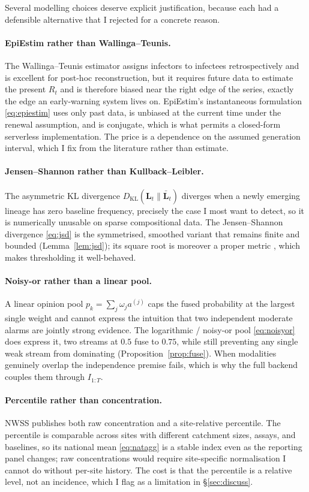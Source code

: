 \documentclass[10pt,twocolumn]{article}
\theoremstyle{definition}
\newcommand{\Rt}{R_t}
\newcommand{\KL}{D_{\mathrm{KL}}}
\begin{document}
Several modelling choices deserve explicit justification, because each had a
defensible alternative that I rejected for a concrete reason.

\paragraph{EpiEstim rather than Wallinga--Teunis.}
The Wallinga--Teunis estimator assigns infectors to infectees retrospectively and
is excellent for post-hoc reconstruction, but it requires future data to estimate
the present $\Rt$ and is therefore biased near the right edge of the series, exactly
the edge an early-warning system lives on. EpiEstim's instantaneous formulation
\eqref{eq:epiestim} uses only past data, is unbiased at the current time under the
renewal assumption, and is conjugate, which is what permits a closed-form
serverless implementation. The price is a dependence on the assumed generation
interval, which I fix from the literature rather than estimate.

\paragraph{Jensen--Shannon rather than Kullback--Leibler.}
The asymmetric KL divergence $\KL(\mathbf L_t\|\bar{\mathbf L}_t)$ diverges when a
newly emerging lineage has zero baseline frequency, precisely the case I most
want to detect, so it is numerically unusable on sparse compositional data. The
Jensen--Shannon divergence \eqref{eq:jsd} is the symmetrised, smoothed variant
that remains finite and bounded (Lemma~\ref{lem:jsd}); its square root is
moreover a proper metric \citep{endres2003}, which makes thresholding it
well-behaved.

\paragraph{Noisy-or rather than a linear pool.}
A linear opinion pool $p_k=\sum_j\omega_j a^{(j)}$ caps the fused probability at
the largest single weight and cannot express the intuition that two independent
moderate alarms are jointly strong evidence. The logarithmic / noisy-or pool
\eqref{eq:noisyor} does express it, two streams at $0.5$ fuse to $0.75$, while
still preventing any single weak stream from dominating
(Proposition~\ref{prop:fuse}). When modalities genuinely overlap the independence
premise fails, which is why the full backend couples them through $I_{1:T}$.

\paragraph{Percentile rather than concentration.}
NWSS publishes both raw concentration and a site-relative percentile. The
percentile is comparable across sites with different catchment sizes, assays, and
baselines, so its national mean \eqref{eq:natagg} is a stable index even as the
reporting panel changes; raw concentrations would require site-specific
normalisation I cannot do without per-site history. The cost is that the
percentile is a relative level, not an incidence, which I flag as a limitation in
\S\ref{sec:discuss}.
\end{document}
